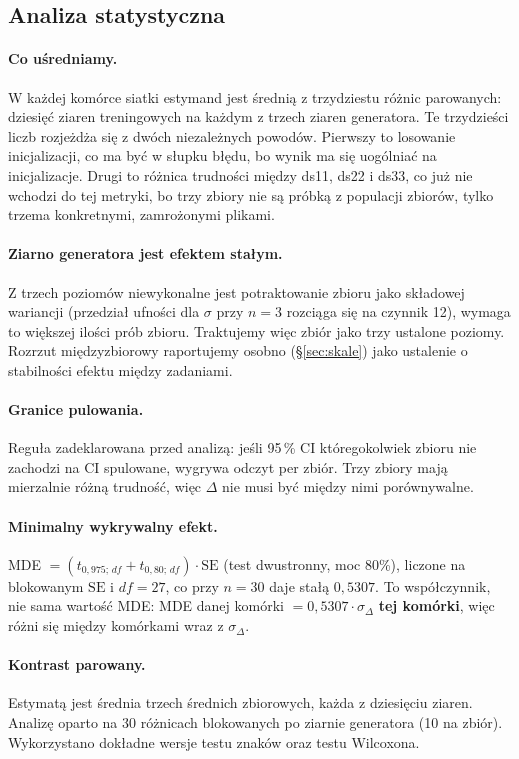 \documentclass[11pt, a4paper]{article}
\begin{document}
\subsection{Analiza statystyczna}

\paragraph{Co uśredniamy.} W każdej komórce siatki estymand jest średnią z trzydziestu różnic parowanych: dziesięć ziaren treningowych na każdym z trzech ziaren generatora. Te trzydzieści liczb rozjeżdża się z dwóch niezależnych powodów. Pierwszy to losowanie inicjalizacji, co ma być w słupku błędu, bo wynik ma się uogólniać na inicjalizacje. Drugi to różnica trudności między ds11, ds22 i ds33, co już nie wchodzi do tej metryki, bo trzy zbiory nie są próbką z populacji zbiorów, tylko trzema konkretnymi, zamrożonymi plikami.
\paragraph{Ziarno generatora jest efektem stałym.} Z trzech poziomów niewykonalne jest potraktowanie zbioru jako składowej wariancji (przedział ufności dla $\sigma$ przy $n=3$ rozciąga się na czynnik 12), wymaga to większej ilości prób zbioru. Traktujemy więc zbiór jako trzy ustalone poziomy. Rozrzut międzyzbiorowy raportujemy osobno (\S\ref{sec:skale}) jako ustalenie o stabilności efektu między zadaniami.

\paragraph{Granice pulowania.} Reguła zadeklarowana przed analizą: jeśli 95\,\% CI któregokolwiek zbioru nie zachodzi na CI spulowane, wygrywa odczyt per zbiór. Trzy zbiory mają mierzalnie różną trudność, więc $\Delta$ nie musi być między nimi porównywalne.

\paragraph{Minimalny wykrywalny efekt.} MDE $= (t_{0{,}975;\,df} + t_{0{,}80;\,df})\cdot \mathrm{SE}$ (test dwustronny, moc 80\%), liczone na blokowanym $\mathrm{SE}$ i $df = 27$, co przy $n = 30$ daje stałą $0{,}5307$. To współczynnik, nie sama wartość MDE: MDE danej komórki $= 0{,}5307 \cdot \sigma_\Delta$ \textbf{tej komórki}, więc różni się między komórkami wraz z $\sigma_\Delta$.

\paragraph{Kontrast parowany.} Estymatą jest średnia trzech średnich zbiorowych, każda z dziesięciu ziaren. Analizę oparto na 30 różnicach blokowanych po ziarnie generatora (10 na zbiór). Wykorzystano dokładne wersje testu znaków oraz testu Wilcoxona. 
\end{document}
